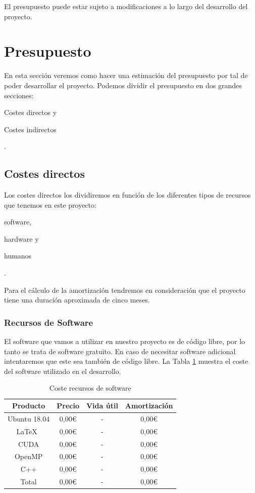 \documentclass[titlepage,12pt]{report}
\begin{document}
El presupuesto puede estar sujeto a modificaciones a lo largo del desarrollo del proyecto.

\section{Presupuesto}

En esta sección veremos como hacer una estimación del presupuesto por tal de poder desarrollar el proyecto. Podemos dividir el presupuesto en dos grandes secciones: \begin{enumerate*}[label=\roman*)] \item Costes directos y \item Costes indirectos
\end{enumerate*}.

\subsection{Costes directos}

Los costes directos los dividiremos en función de los diferentes tipos de recursos que tenemos en este proyecto: \begin{enumerate*}[label=\roman*)] \item software, \item hardware y \item humanos \end{enumerate*}.

Para el cálculo de la amortización tendremos en consideración que el proyecto tiene una duración aproximada de cinco meses.

\subsubsection{Recursos de Software}

El software que vamos a utilizar en nuestro proyecto es de código libre, por lo tanto se trata de software gratuito. En caso de necesitar software adicional intentaremos que este sea también de código libre. La Tabla \ref{soft} muestra el coste del software utilizado en el desarrollo.

\begin{table}[H]
	\centering
	\begin{tabular}{|c|c|c|c|}
		\hline
		\textbf{Producto} & \textbf{Precio} & \textbf{Vida útil} & \textbf{Amortización} \\ \hline \hline
		Ubuntu 18.04 	& 0,00€ & - & 0,00€ \\ \hline
		\LaTeX\ 		& 0,00€ & - & 0,00€ \\ \hline
		CUDA 			& 0,00€ & - & 0,00€ \\ \hline
		OpenMP 			& 0,00€ & - & 0,00€ \\ \hline
		C++ 			& 0,00€ & - & 0,00€ \\ \hline	\hline
		Total 			& 0,00€ & - & 0,00€ \\ \hline
	\end{tabular}
	\caption{Coste recursos de software}
	\label{soft}
\end{table}
\end{document}
